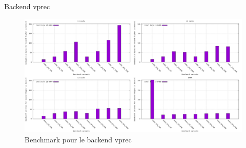\documentclass{beamer}
\begin{document}
\begin{frame}{Backend vprec}

  \begin{center}
    \begin{figure}
      \includegraphics[scale=0.2]{../ressources/vprec_bw.png}
      \caption{\label{fig:backend_vprec}Benchmark pour le backend vprec}
    \end{figure}
  \end{center}
  
\end{frame}
\end{document}
